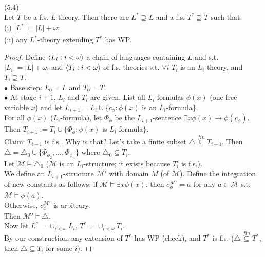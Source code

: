 \documentclass[a4paper]{article}
\begin{document}
\begin{lemma} (5.4)\\
    Let $T$ be a f.s. $L$-theory. Then there are $L^* \supseteq L$ and a f.s. $T^* \supseteq T$ such that:\\
    (i) $|L^*| = |L| + \omega$;\\
    (ii) any $L^*$-theory extending $T^*$ has WP.
    \begin{proof}
        Define $\langle L_i: i < \omega \rangle$ a chain of languages containing $L$ and s.t. $|L_i| = |L|+\omega$, and $\langle T_i: i < \omega \rangle$ of f.s. theories s.t. $\forall i$ $T_i$ is an $L_i$-theory, and $T_i \supseteq T$.\\
        $\bullet$ Base step: $L_0=L$ and $T_0=T$.\\
        $\bullet$ At stage $i+1$, $L_i$ and $T_i$ are given. List all $L_i$-formulas $\phi(x)$ (one free variable $x$) and let $L_{i+1} = L_i \cup \{c_\phi:\phi(x)$ is an $L_i$-formula$\}$.\\
        For all $\phi(x)$ ($L_i$-formula), let $\Phi_\phi$ be the $L_{i+1}$-sentence $\exists x\phi(x) \to \phi(c_\phi)$.\\
        Then $T_{i+1}:= T_i \cup \{\Phi_\phi: \phi(x)$ is $L_i$-formula$\}$.\\
        Claim: $T_{i+1}$ is f.s.. Why is that? Let's take a finite subset $\triangle \stackrel{fin}{\subseteq} T_{i+1}$. Then $\triangle = \triangle_0 \cup \{\Phi_{\phi_2},...,\Phi_{\phi_n}\}$ where $\triangle_0 \subseteq T_i$.\\
        Let $\mathcal{M} \vDash \triangle_0$ ($\mathcal{M}$ is an $L_i$-structure; it exists because $T_i$ is f.s.).\\
        We define an $L_{i+1}$-structure $\mathcal{M'}$ with domain $M$ (of $\mathcal{M}$). Define the integration of new constants as follows: if $\mathcal{M} \vDash \exists x \phi(x)$, then $c_\phi^{\mathcal{M}'} = a$ for any $a \in \mathcal{M}$ s.t. $\mathcal{M} \vDash \phi(a)$.\\
        Otherwise, $c_\phi^{\mathcal{M}'}$ is arbitrary.\\
        Then $\mathcal{M}' \vDash \triangle$.\\
        Now let $L^* = \cup_{i < \omega} L_i$, $T^* = \cup_{i<\omega} T_i$.\\
        By our construction, any extension of $T^*$ has WP (check), and $T^*$ is f.s. ($\triangle \stackrel{fin}{\subseteq} T^*$, then $\triangle \subseteq T_i$ for some $i$). 
    \end{proof}
\end{lemma}
\end{document}
